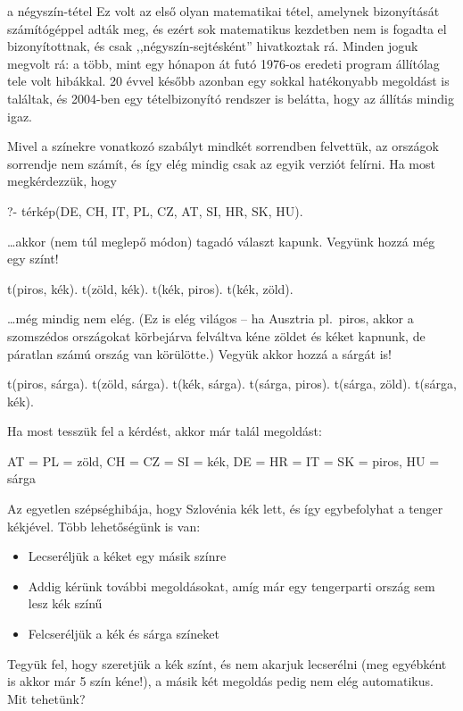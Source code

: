 \begin{infobox}{}{a négyszín-tétel}
Ez volt az első olyan matematikai tétel, amelynek
bizonyítását számítógéppel adták meg, és ezért sok
matematikus kezdetben nem is fogadta el
bizonyítottnak, és csak ,,négyszín-sejtésként''
hivatkoztak rá. Minden joguk megvolt rá: a több,
mint egy hónapon át futó 1976-os eredeti program
állítólag tele volt hibákkal. 20 évvel később
azonban egy sokkal hatékonyabb megoldást is
találtak, és 2004-ben egy tételbizonyító rendszer is
belátta, hogy az állítás mindig igaz.
\end{infobox}

Mivel a színekre vonatkozó szabályt mindkét
sorrendben felvettük, az országok sorrendje nem
számít, és így elég mindig csak az egyik verziót
felírni. Ha most megkérdezzük, hogy
\begin{query}
?- térkép(DE, CH, IT, PL, CZ, AT, SI, HR, SK, HU).
\end{query}
\dots akkor (nem túl meglepő módon) tagadó választ
kapunk. Vegyünk hozzá még egy színt!
\begin{program}
t(piros, kék). t(zöld, kék).
t(kék, piros). t(kék, zöld).
\end{program}
\dots még mindig nem elég. (Ez is elég világos -- ha
Ausztria pl.~piros, akkor a szomszédos országokat
körbejárva felváltva kéne zöldet és kéket kapnunk,
de páratlan számú ország van körülötte.)
Vegyük akkor hozzá a sárgát is!
\begin{program}
t(piros, sárga). t(zöld, sárga). t(kék, sárga).
t(sárga, piros). t(sárga, zöld). t(sárga, kék).
\end{program}
Ha most tesszük fel a kérdést, akkor már talál
megoldást:
\begin{query}
AT = PL = zöld,
CH = CZ = SI = kék,
DE = HR = IT = SK = piros,
HU = sárga
\end{query}
Az egyetlen szépséghibája, hogy Szlovénia kék lett,
és így egybefolyhat a tenger kékjével. Több
lehetőségünk is van:
\begin{itemize}
\item Lecseréljük a kéket egy másik színre
\item Addig kérünk további megoldásokat, amíg már
  egy tengerparti ország sem lesz kék színű
\item Felcseréljük a kék és sárga színeket
\end{itemize}

Tegyük fel, hogy szeretjük a kék színt, és nem
akarjuk lecserélni (meg egyébként is akkor már 5
szín kéne!), a másik két megoldás pedig nem elég
automatikus. Mit tehetünk?

